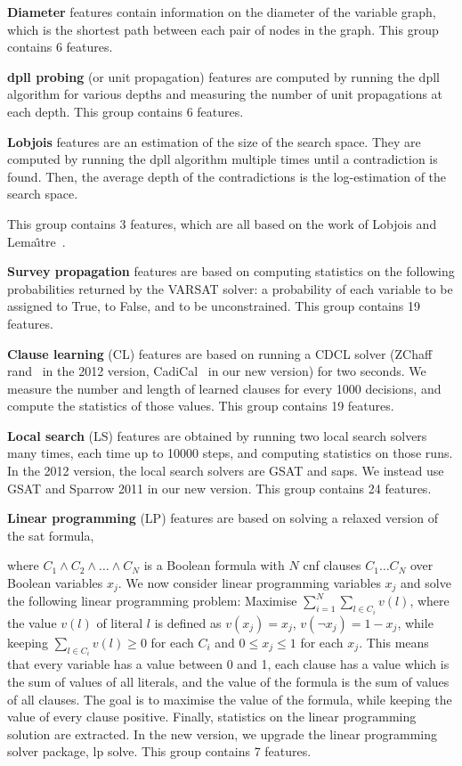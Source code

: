 \noindent\textbf{Diameter} features contain information on the diameter of the variable graph, which is the shortest path between each pair of nodes in the graph. This group contains 6 features.

\noindent\textbf{\gls{dpll} probing} (or unit propagation) features are computed by running the \gls{dpll} algorithm for various depths and measuring the number of unit propagations at each depth. This group contains 6 features.

\noindent\textbf{Lobjois} features are an estimation of the size of the search space. They are computed by running the \gls{dpll} algorithm multiple times until a contradiction is found. Then, the average depth of the contradictions is the log-estimation of the search space. 

This group contains 3 features, which are all based on the work of Lobjois and Lema\^{\i}tre~\cite{LobLem98}.

\noindent\textbf{Survey propagation} features are based on computing statistics on the following probabilities returned by the VARSAT \cite{HsuMcI09} solver: a probability of each variable to be assigned to True, to False, and to be unconstrained. This group contains 19 features.

    
\noindent\textbf{Clause learning} (CL) features are based on running a CDCL solver (ZChaff rand~\cite{MahEtAl04} in the 2012 version, CadiCal~\cite{BieEtAl20} in our new version) for two seconds. We measure the number and length of learned clauses for every 1000 decisions, and compute the statistics of those values. This group contains 19 features.

\noindent\textbf{Local search} (LS) features are obtained by running two local search solvers many times, each time up to 10000 steps, and computing statistics on those runs. In the 2012 version, the local search solvers are GSAT and \gls{saps}. We instead use GSAT and Sparrow 2011 in our new version. This group contains 24 features.

\noindent\textbf{Linear programming} (LP) features are based on solving a relaxed version of the \gls{sat} formula, 

where $C_1\land C_2\land \dots \land C_N$ is a Boolean formula with $N$ \gls{cnf} clauses $C_1 \ldots C_N$ over Boolean variables $x_j$. We now consider linear programming variables $x_j$ and
solve the following linear programming problem:
Maximise
    $\sum_{i=1}^N \sum_{l\in C_i} v(l)$, 
where the value $v(l)$ of literal $l$ is defined as $v(x_j)=x_j$, $v(\neg x_j)=1-x_j$, 
    while keeping
    $\sum_{l\in C_i} v(l) \geq 0$ 
    for each $C_i$ and $0 \leq x_j \leq 1$ for each $x_j$. 
    This means that every variable has a value between 0 and 1, each clause has a value which is the sum of values of all literals, and the value of the formula is the sum of values of all clauses. The goal is to maximise the value of the formula, while keeping the value of every clause positive. Finally, statistics on the linear programming solution are extracted. In the new version, we upgrade the linear programming solver package, lp solve. This group contains 7 features.


